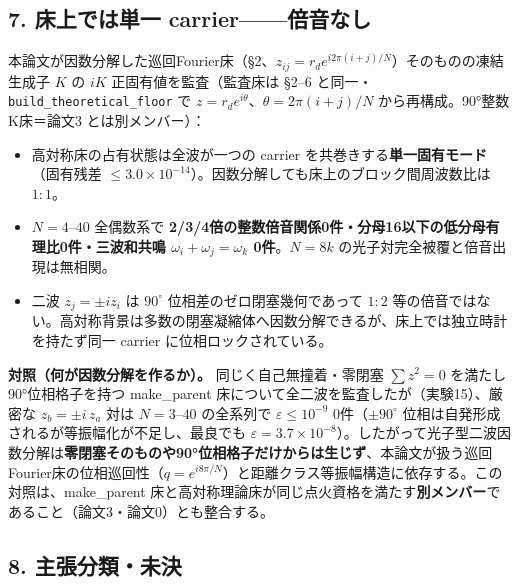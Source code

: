 \documentclass[
  a4paper,
]{ltjsarticle}
\providecommand{\tightlist}{%
  \setlength{\itemsep}{0pt}\setlength{\parskip}{0pt}}
\begin{document}
\subsection{7. 床上では単一
carrier------倍音なし}\label{ux5e8aux4e0aux3067ux306fux5358ux4e00-carrierux500dux97f3ux306aux3057}

本論文が因数分解した巡回Fourier床（§2、\(z_{ij}=r_d e^{i2\pi(i+j)/N}\)）そのものの凍結生成子
\(K\) の \(iK\) 正固有値を監査（監査床は §2--6
と同一・\texttt{build\_theoretical\_floor} で
\(z=r_d e^{i\theta}\)、\(\theta=2\pi(i+j)/N\)
から再構成。90°整数K床＝論文3 とは別メンバー）：

\begin{itemize}
\tightlist
\item
  高対称床の占有状態は全波が一つの carrier
  を共巻きする\textbf{単一固有モード}（固有残差
  \(\le3.0\times10^{-14}\)）。因数分解しても床上のブロック間周波数比は
  \(1{:}1\)。
\item
  \(N=4\)--\(40\) 全偶数系で
  \textbf{2/3/4倍の整数倍音関係0件・分母16以下の低分母有理比0件・三波和共鳴
  \(\omega_i+\omega_j=\omega_k\) 0件}。\(N=8k\)
  の光子対完全被覆と倍音出現は無相関。
\item
  二波 \(z_j=\pm iz_i\) は \(90^\circ\) 位相差のゼロ閉塞幾何であって
  \(1{:}2\)
  等の倍音ではない。高対称背景は多数の閉塞凝縮体へ因数分解できるが、床上では独立時計を持たず同一
  carrier に位相ロックされている。
\end{itemize}

\textbf{対照（何が因数分解を作るか）。} 同じく自己無撞着・零閉塞
\(\sum z^2=0\) を満たし90°位相格子を持つ make\_parent
床について全二波を監査したが（実験15）、厳密な \(z_b=\pm i\,z_a\) 対は
\(N=3\)--\(40\) の全系列で \(\varepsilon\le10^{-9}\)
0件（\(\pm90^\circ\) 位相は自発形成されるが等振幅化が不足し、最良でも
\(\varepsilon=3.7\times10^{-8}\)）。したがって光子型二波因数分解は\textbf{零閉塞そのものや90°位相格子だけからは生じず}、本論文が扱う巡回Fourier床の位相巡回性（\(q=e^{i8\pi/N}\)）と距離クラス等振幅構造に依存する。この対照は、make\_parent
床と高対称理論床が同じ点火資格を満たす\textbf{別メンバー}であること（論文3・論文0）とも整合する。

\subsection{8.
主張分類・未決}\label{ux4e3bux5f35ux5206ux985eux672aux6c7a}
\end{document}
